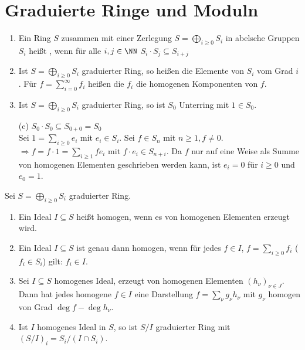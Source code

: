 \section{Graduierte Ringe und Moduln}

\begin{DefBem}
\label{2.13}

\begin{enumerate}

\item Ein Ring $S$ zusammen mit einer Zerlegung $S=\bigoplus_{i\geq 0}S_i$
in abelsche Gruppen $S_i$ hei\ss t , wenn f\"ur alle $i, j\in \NN$
$S_i\cdot S_j\subseteq S_{i+j}$

\item Ist $S=\bigoplus_{i\geq 0} S_i$ graduierter Ring, so hei\ss en die Elemente
von $S_i$  vom Grad $i$.
F\"ur $f=\sum_{i=0}^{\infty} f_i$ hei\ss en die $f_i$ die homogenen Komponenten von $f$.

\item Ist $S=\bigoplus_{i\geq 0} S_i$ graduierter Ring, so ist $S_0$ Unterring mit $1\in S_0$.
\end{enumerate}

\end{DefBem}

\begin{Bew}
\begin{enumerate}
\item[(c)] $S_0\cdot S_0\subseteq S_{0+0}=S_0$\\
Sei $1=\sum_{i\geq 0}e_i$ mit $e_i\in S_i$. Sei $f\in S_n$ mit $n\geq 1, f\neq 0$.
$\Rightarrow f=f\cdot 1 = \sum_{i\geq 1}fe_i$ mit $f\cdot e_i\in S_{n+i}$.
Da $f$ nur auf eine Weise als Summe von homogenen Elementen geschrieben werden
kann, ist $e_i=0$ f\"ur $i\geq 0$ und $e_0=1$.

\end{enumerate}
\end{Bew}

\begin{DefBem}
\label{2.14}
Sei $S=\bigoplus_{i\geq 0} S_i$ graduierter Ring.
\begin{enumerate}
\item Ein Ideal $I\subseteq S$ hei\ss t homogen, wenn es von homogenen Elementen erzeugt wird.
\item\label{2.14b} Ein Ideal $I\subseteq S$ ist genau dann homogen, wenn
f\"ur jedes $f\in I$, $f=\sum_{i\geq 0} f_i$ ($f_i\in S_i$) gilt: $f_i\in I$.

\item Sei $I\subseteq S$ homogenes Ideal, erzeugt von homogenen Elementen $(h_\nu)_{\nu\in J}$.
Dann hat jedes homogene $f\in I$ eine Darstellung $f=\sum_{\nu}g_\nu h_\nu$ mit $g_\nu$ 
homogen von Grad $\deg f - \deg{h_\nu}$.

\item Ist $I$ homogenes Ideal in $S$, so ist $S/I$ graduierter Ring mit
$(S/I)_i=S_i/(I\cap S_i)$.

\end{enumerate}
\end{DefBem}

